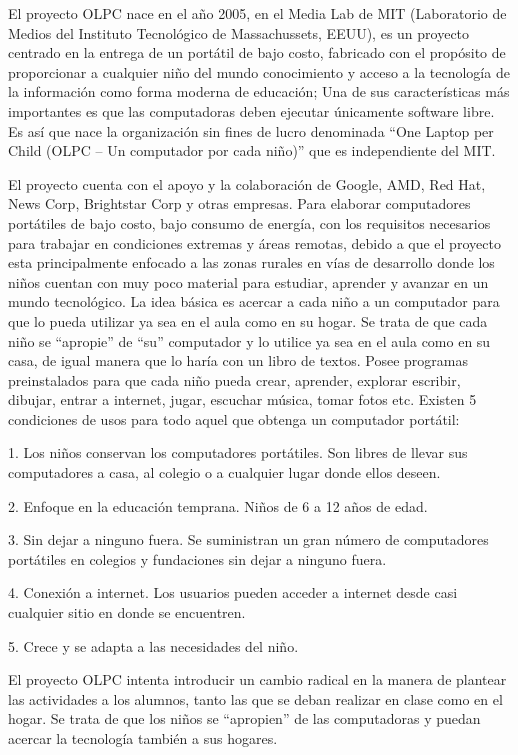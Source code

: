 El proyecto OLPC nace en el año 2005, en el Media Lab de MIT
(Laboratorio de Medios del Instituto Tecnológico de
Massachussets, EEUU), es un proyecto centrado en la entrega
de un portátil de bajo costo, fabricado con el propósito de
proporcionar a cualquier niño del mundo conocimiento y acceso
a la tecnología de la información como forma moderna de
educación; Una de sus características más importantes es que
las computadoras deben ejecutar únicamente software libre. Es
así que nace la organización sin fines de lucro denominada “One
Laptop per Child (OLPC – Un computador por cada niño)” que es
independiente del MIT.

El proyecto cuenta con el apoyo y la colaboración de Google,
AMD, Red Hat, News Corp, Brightstar Corp y otras empresas.
Para elaborar computadores portátiles de bajo costo, bajo
consumo de energía, con los requisitos necesarios para trabajar
en condiciones extremas y áreas remotas, debido a que el
proyecto esta principalmente enfocado a las zonas rurales en
vías de desarrollo donde los niños cuentan con muy poco
material para estudiar, aprender y avanzar en un mundo
tecnológico. La idea básica es acercar a cada niño a un
computador para que lo pueda utilizar ya sea en el aula como en
su hogar. Se trata de que cada niño se “apropie” de “su”
computador y lo utilice ya sea en el aula como en su casa, de
igual manera que lo haría con un libro de textos.
Posee programas preinstalados para que cada niño pueda crear,
aprender, explorar escribir, dibujar, entrar a internet, jugar,
escuchar música, tomar fotos etc.
Existen 5 condiciones de usos para todo aquel que obtenga un
computador portátil:

1. Los niños conservan los computadores portátiles.
   Son libres de llevar sus computadores a casa, al colegio o
   a cualquier lugar donde ellos deseen.

2. Enfoque en la educación temprana.
   Niños de 6 a 12 años de edad.

3. Sin dejar a ninguno fuera.
   Se suministran un gran número de computadores
   portátiles en colegios y fundaciones sin dejar a ninguno
   fuera.
   
4. Conexión a internet.
   Los usuarios pueden acceder a internet desde casi
   cualquier sitio en donde se encuentren.
   
5. Crece y se adapta a las necesidades del niño.

El proyecto OLPC intenta introducir un cambio radical en la
manera de plantear las actividades a los alumnos, tanto las que
se deban realizar en clase como en el hogar. Se trata de que los
niños se “apropien” de las computadoras y puedan acercar la
tecnología también a sus hogares.

